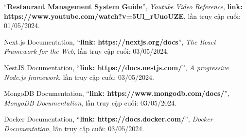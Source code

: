\documentclass[a4paper]{article}
\begin{document}
\begin{thebibliography}{80}

``\textbf{Restaurant Management System Guide}'',
\textit{Youtube Video Reference}, 
\textbf{link: https://www.youtube.com/watch?v=5Ul\_rUuoUZE},
lần truy cập cuối: 01/05/2024.

Next.js Documentation,
``\textbf{link: https://nextjs.org/docs}'',
\textit{The React Framework for the Web},
lần truy cập cuối: 03/05/2024.

NestJS Documentation,
``\textbf{link: https://docs.nestjs.com/}'',
\textit{A progressive Node.js framework},
lần truy cập cuối: 03/05/2024.

MongoDB Documentation,
``\textbf{link: https://www.mongodb.com/docs/}'',
\textit{MongoDB Documentation},
lần truy cập cuối: 03/05/2024.

Docker Documentation,
``\textbf{link: https://docs.docker.com/}'',
\textit{Docker Documentation},
lần truy cập cuối: 03/05/2024.

\end{thebibliography}
\end{document}
